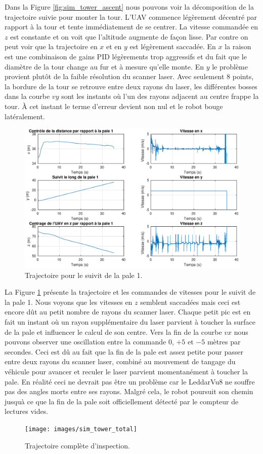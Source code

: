 Dans la Figure \ref{fig:sim_tower_ascent} nous pouvons voir la décomposition de la trajectoire suivie pour monter la tour. L'UAV commence légèrement décentré par rapport à la tour et tente immédiatement de se centrer. La vitesse commandée en $z$ est constante et on voit que l'altitude augmente de façon lisse. Par contre on peut voir que la trajectoire en $x$ et en $y$ est légèrement saccadée. En $x$ la raison est une combinaison de gains PID légèrements trop aggressifs et du fait que le diamètre de la tour change au fur et à mesure qu'elle monte. En $y$ le problème provient plutôt de la faible résolution du scanner laser. Avec seulement 8 points, la bordure de la tour se retrouve entre deux rayons du laser, les différentes bosses dans la courbe $vy$ sont les instants où l'un des rayons adjacent au centre frappe la tour. À cet instant le terme d'erreur devient non nul et le robot bouge latéralement.
\begin{figure}[htb]
  \centering
  \includegraphics[trim=30 20 30 0, clip, width=\linewidth]{images/sim_suivit_pale}
  \caption{Trajectoire pour le suivit de la pale 1.}
  \label{fig:sim_suivit_pale}
\end{figure}

La Figure \ref{fig:sim_suivit_pale} présente la trajectoire et les commandes de vitesses pour le suivit de la pale 1. Nous voyons que les vitesses en $z$ semblent saccadées mais ceci est encore dût au petit nombre de rayons du scanner laser. Chaque petit pic est en fait un instant où un rayon supplémentaire du laser parvient à toucher la surface de la pale et influencer le calcul de son centre. Vers la fin de la courbe $vx$ nous pouvons observer une oscillation entre la commande $0$, $+5$ et $-5$ mètres par secondes. Ceci est dû au fait que la fin de la pale est assez petite pour passer entre deux rayons du scanner laser, combiné au mouvement de tangage du véhicule pour avancer et reculer le laser parvient momentanément à toucher la pale. En réalité ceci ne devrait pas être un problème car le LeddarVu8 ne souffre pas des angles morts entre ses rayons. Malgré cela, le robot poursuit son chemin jusquà ce que la fin de la pale soit officiellement détecté par le compteur de lectures vides.
\begin{figure}[htb]
  \centering
  \texttt{[image: images/sim\_tower\_total]}
  \caption{Trajectoire complète d'inspection.}
  \label{fig:sim_tower_total}
\end{figure}

